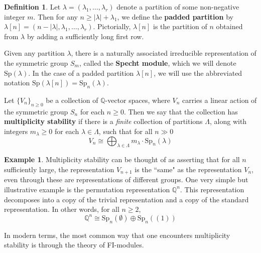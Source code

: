 \documentclass[12pt]{amsart}
\theoremstyle{definition}
\newtheorem{defn}[thm]{Definition}
\newtheorem{example}[thm]{Example}
\newcommand{\Q}{\mathbb{Q}}
\newcommand{\Sp}{\mathrm{Sp}}
\begin{document}
\begin{defn}
    Let $\lambda = (\lambda_1,\ldots,\lambda_r)$ denote a partition of some non-negative integer $m$. Then for any $n \geq |\lambda| + \lambda_1$, we define the \textbf{padded partition} by $\lambda[n] = (n-|\lambda|,\lambda_1,\ldots,\lambda_r)$. Pictorially, $\lambda[n]$ is the partition of $n$ obtained from $\lambda$ by adding a sufficiently long first row.
    
    Given any partition $\lambda$, there is a naturally associated irreducible representation of the symmetric group $S_m$, called the \textbf{Specht module}, which we will denote $\Sp(\lambda)$. In the case of a padded partition $\lambda[n]$, we will use the abbreviated notation $\Sp(\lambda[n]) = \Sp_n(\lambda)$.

    
    Let $\{V_n\}_{n \geq 0}$ be a collection of $\Q$-vector spaces, where $V_n$ carries a linear action of the symmetric group $S_n$ for each $n \geq 0$. Then we say that the collection has \textbf{multiplicity stability} if there is a \emph{finite} collection of partitions $\Lambda$, along with integers $m_\lambda \geq 0$ for each $\lambda \in \Lambda$, such that for all $n \gg 0$
    \[
    V_n \cong \bigoplus_{\lambda \in \Lambda} m_\lambda \cdot \Sp_n(\lambda)
    \]
\end{defn}

\begin{example}
    Multiplicity stability can be thought of as asserting that for all $n$ sufficiently large, the representation $V_{n+1}$ is the ``same" as the representation $V_n$, even through these are representations of different groups. One very simple but illustrative example is the permutation representation $\Q^n$. This representation decomposes into a copy of the trivial representation and a copy of the standard representation. In other words, for all $n \geq 2$,
    \[
    \Q^n \cong \Sp_n(\emptyset) \oplus \Sp_n( (1) )
    \]
\end{example}

In modern terms, the most common way that one encounters multiplicity stability is through the theory of FI-modules.
\end{document}
